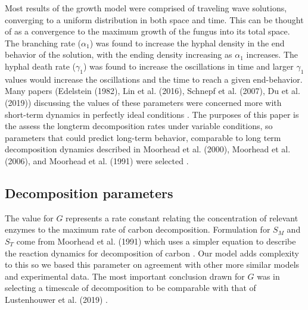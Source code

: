 \documentclass[12pt]{article}
\begin{document}
\begin{multicols}{2}
Most results of the growth model were comprised of traveling wave solutions, converging to a uniform distribution in both space and time. This can be thought of as a convergence to the maximum growth of the fungus into its total space. The branching rate ($\alpha_{1}$) was found to increase the hyphal density in the end behavior of the solution, with the ending density increasing as $\alpha_{1}$ increases. The hyphal death rate ($\gamma_{1}$) was found to increase the oscillations in time and larger $\gamma_{1}$ values would increase the oscillations and the time to reach a given end-behavior. Many papers (Edelstein (1982), Lin et al. (2016), Schnepf et al. (2007), Du et al. (2019)) discussing the values of these parameters were concerned more with short-term dynamics in perfectly ideal conditions \cite{Edelstein1982, Lin2016, Schnepf2008, Du2019}. The purposes of this paper is the assess the longterm decomposition rates under variable conditions, so parameters that could predict long-term behavior, comparable to long term decomposition dynamics described in Moorhead et al. (2000), Moorhead et al. (2006), and Moorhead et al. (1991) were selected \cite{Moorhead1991, Moorhead2000, Moorhead2006}.


\subsection{Decomposition parameters}
The value for $G$ represents a rate constant relating the concentration of relevant enzymes to the maximum rate of carbon decomposition. Formulation for $S_{M}$ and $S_{T}$ come from Moorhead et al. (1991) which uses a simpler equation to describe the reaction dynamics for decomposition of carbon \cite{Moorhead1991}. Our model adds complexity to this so we based this parameter on agreement with other more similar models and experimental data. The most important conclusion drawn for $G$ was in selecting a timescale of decomposition to be comparable with that of Lustenhouwer et al. (2019) \cite{Lustenhouwer2020}.



\end{multicols}
\end{document}
